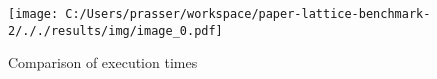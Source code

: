 \documentclass{article}
\begin{document}
	\begin{figure*}[!htbp]
		\centering
		\texttt{[image: C:/Users/prasser/workspace/paper-lattice-benchmark-2/././results/img/image\_0.pdf]}
		\caption{Comparison of execution times}
	\end{figure*}
	\clearpage
\end{document}
